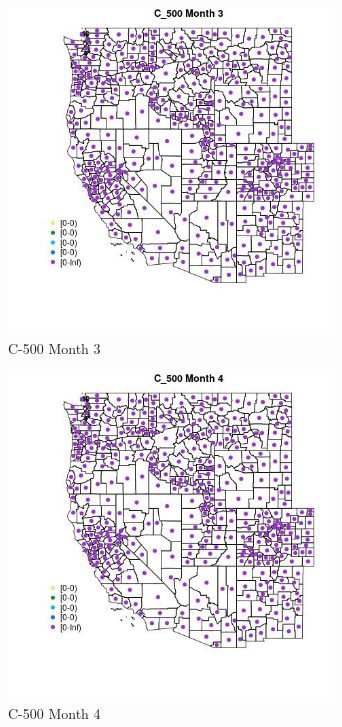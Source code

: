 \begin{figure} 
\centering  
\includegraphics[width=0.77\textwidth]{Code_Outputs/df_report_ML_predictors_CountyCentroid_Locations_Dates_2008-01-01to2018-12-31_MapObsMo3C_500.jpg} 
\caption{\label{fig:df_report_ML_predictors_CountyCentroid_Locations_Dates_2008-01-01to2018-12-31MapObsMo3C_500}C-500 Month 3} 
\end{figure} 
 

\begin{figure} 
\centering  
\includegraphics[width=0.77\textwidth]{Code_Outputs/df_report_ML_predictors_CountyCentroid_Locations_Dates_2008-01-01to2018-12-31_MapObsMo4C_500.jpg} 
\caption{\label{fig:df_report_ML_predictors_CountyCentroid_Locations_Dates_2008-01-01to2018-12-31MapObsMo4C_500}C-500 Month 4} 
\end{figure} 
 

